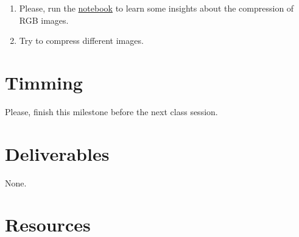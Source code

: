 \begin{enumerate}
\item Please, run the
  \href{https://github.com/Sistemas-Multimedia/Sistemas-Multimedia.github.io/blob/master/contents/RGB_quantization/RD_performance.ipynb}{notebook}
  to learn some insights about the compression of RGB images.
\item Try to compress different images.
\end{enumerate}

\section{Timming}

Please, finish this milestone before the next class session.

\section{Deliverables}

None.

\section{Resources}

\renewcommand{\addcontentsline}[3]{}%

